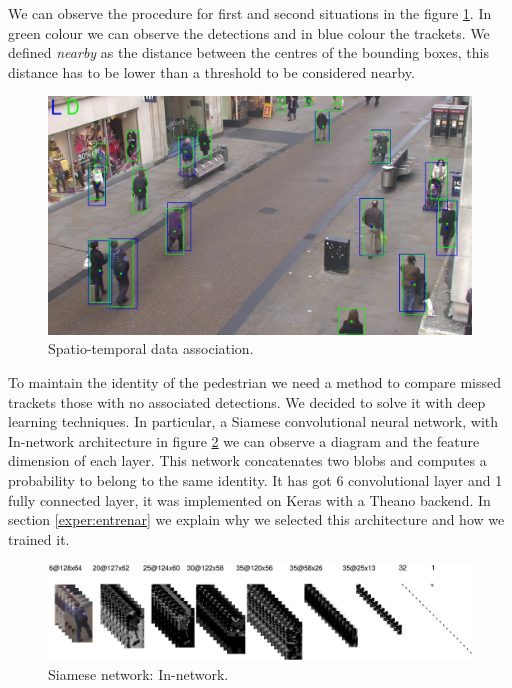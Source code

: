 We can observe the procedure for first and second situations in the figure \ref{data1}. In green colour we can observe the detections and in blue colour the trackets. We defined \textit{nearby} as the distance between the centres of the bounding boxes, this distance has to be lower than a threshold to be considered nearby. 

\begin{figure}[hptb]
\centering         
\includegraphics[width=\textwidth]{lucasKanade/dataAssociation.jpg}
\caption{Spatio-temporal data association.} \label{data1}
\end{figure}


To maintain the identity of the pedestrian we need a method to compare missed trackets those with no associated detections. We decided to solve it with deep learning techniques. In particular, a Siamese convolutional neural network, with In-network architecture in figure \ref{saimss} we can observe a diagram and the feature dimension of each layer. This network concatenates two blobs and computes a probability to belong to the same identity. It has got 6 convolutional layer and 1 fully connected layer, it was implemented on Keras with a Theano backend. In section \ref{exper:entrenar} we explain why we selected this architecture and how we trained it.



\begin{figure}[!]
\centering         
\includegraphics[width=\textwidth]{timesDiagram/network6conv.png}
\caption{Siamese network: In-network.} \label{saimss}
\end{figure}


